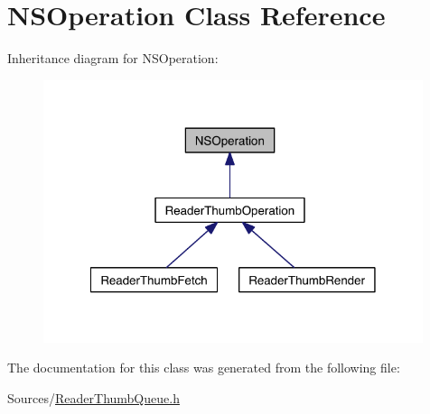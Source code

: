 \hypertarget{class_n_s_operation}{\section{N\-S\-Operation Class Reference}
\label{dc/df8/class_n_s_operation}
}


Inheritance diagram for N\-S\-Operation\-:
\nopagebreak
\begin{figure}[H]
\begin{center}
\leavevmode
\includegraphics[width=315pt]{d8/d04/class_n_s_operation__inherit__graph}
\end{center}
\end{figure}


The documentation for this class was generated from the following file\-:\begin{DoxyCompactItemize}
\item 
Sources/\hyperlink{_reader_thumb_queue_8h}{Reader\-Thumb\-Queue.\-h}\end{DoxyCompactItemize}
